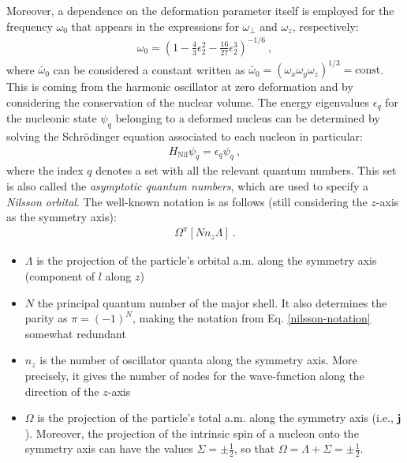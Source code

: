 Moreover, a dependence on the deformation parameter itself is employed for the frequency $\omega_0$ that appears in the expressions for $\omega_\perp$ and $\omega_z$, respectively:
\begin{align}
    \omega_0=\left(1-\frac{4}{3}\epsilon_2^2-\frac{16}{27}\epsilon_2^3\right)^{-1/6}\ ,
    \label{omega-0-oscillator-frequency}
\end{align}
where $\bar{\omega}_0$ can be considered a constant written as $\bar{\omega}_0=(\omega_x\omega_y\omega_z)^{1/3}=\text{const}$. This is coming from the harmonic oscillator at zero deformation and by considering the conservation of the nuclear volume. The energy eigenvalues $\epsilon_q$ for the nucleonic state $\psi_q$ belonging to a deformed nucleus can be determined by solving the Schrödinger equation associated to each nucleon in particular:
\begin{align}
    H_\text{Nil}\psi_q=\epsilon_q\psi_q\ ,
    \label{nilsson-schrodiner-equation}
\end{align}
where the index $q$ denotes a set with all the relevant quantum numbers. This set is also called the \emph{asymptotic quantum numbers}, which are used to specify a \emph{Nilsson orbital}. The well-known notation is as follows (still considering the $z$-axis as the symmetry axis):
\begin{align}
    \Omega^\pi\left[Nn_z\Lambda\right]\ .
    \label{nilsson-notation}
\end{align}
\begin{itemize}
    \item $\Lambda$ is the projection of the particle's orbital a.m. along the symmetry axis (component of $l$ along $z$)
    \item $N$ the principal quantum number of the major shell. It also determines the parity as $\pi=(-1)^N$, making the notation from Eq. \ref{nilsson-notation} somewhat redundant
    \item $n_z$ is the number of oscillator quanta along the symmetry axis. More precisely, it gives the number of nodes for the wave-function along the direction of the $z$-axis
    \item $\Omega$ is the projection of the particle's total a.m. along the symmetry axis (i.e., $\mathbf{j}$). Moreover, the projection of the intrinsic spin of a nucleon onto the symmetry axis can have the values $\Sigma=\pm\frac{1}{2}$, so that $\Omega=\Lambda+\Sigma=\pm\frac{1}{2}$.
\end{itemize}

